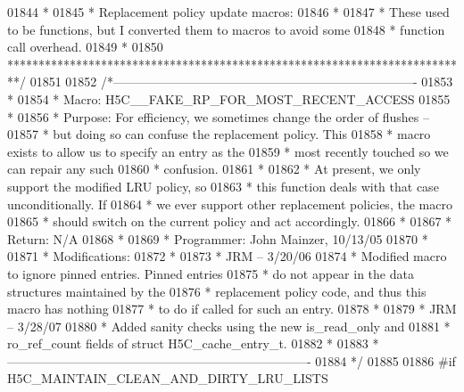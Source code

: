 \begin{DoxyCode}
01844 \textcolor{comment}{ *}
01845 \textcolor{comment}{ * Replacement policy update macros:}
01846 \textcolor{comment}{ *}
01847 \textcolor{comment}{ * These used to be functions, but I converted them to macros to avoid some}
01848 \textcolor{comment}{ * function call overhead.}
01849 \textcolor{comment}{ *}
01850 \textcolor{comment}{ **************************************************************************/}
01851 
01852 \textcolor{comment}{/*-------------------------------------------------------------------------}
01853 \textcolor{comment}{ *}
01854 \textcolor{comment}{ * Macro:   H5C\_\_FAKE\_RP\_FOR\_MOST\_RECENT\_ACCESS}
01855 \textcolor{comment}{ *}
01856 \textcolor{comment}{ * Purpose:     For efficiency, we sometimes change the order of flushes --}
01857 \textcolor{comment}{ *      but doing so can confuse the replacement policy.  This}
01858 \textcolor{comment}{ *      macro exists to allow us to specify an entry as the}
01859 \textcolor{comment}{ *      most recently touched so we can repair any such}
01860 \textcolor{comment}{ *      confusion.}
01861 \textcolor{comment}{ *}
01862 \textcolor{comment}{ *      At present, we only support the modified LRU policy, so}
01863 \textcolor{comment}{ *      this function deals with that case unconditionally.  If}
01864 \textcolor{comment}{ *      we ever support other replacement policies, the macro}
01865 \textcolor{comment}{ *      should switch on the current policy and act accordingly.}
01866 \textcolor{comment}{ *}
01867 \textcolor{comment}{ * Return:      N/A}
01868 \textcolor{comment}{ *}
01869 \textcolor{comment}{ * Programmer:  John Mainzer, 10/13/05}
01870 \textcolor{comment}{ *}
01871 \textcolor{comment}{ * Modifications:}
01872 \textcolor{comment}{ *}
01873 \textcolor{comment}{ *      JRM -- 3/20/06}
01874 \textcolor{comment}{ *      Modified macro to ignore pinned entries.  Pinned entries}
01875 \textcolor{comment}{ *      do not appear in the data structures maintained by the}
01876 \textcolor{comment}{ *      replacement policy code, and thus this macro has nothing}
01877 \textcolor{comment}{ *      to do if called for such an entry.}
01878 \textcolor{comment}{ *}
01879 \textcolor{comment}{ *      JRM -- 3/28/07}
01880 \textcolor{comment}{ *      Added sanity checks using the new is\_read\_only and}
01881 \textcolor{comment}{ *      ro\_ref\_count fields of struct H5C\_cache\_entry\_t.}
01882 \textcolor{comment}{ *}
01883 \textcolor{comment}{ *-------------------------------------------------------------------------}
01884 \textcolor{comment}{ */}
01885 
01886 \textcolor{preprocessor}{#if H5C\_MAINTAIN\_CLEAN\_AND\_DIRTY\_LRU\_LISTS}

\end{DoxyCode}
